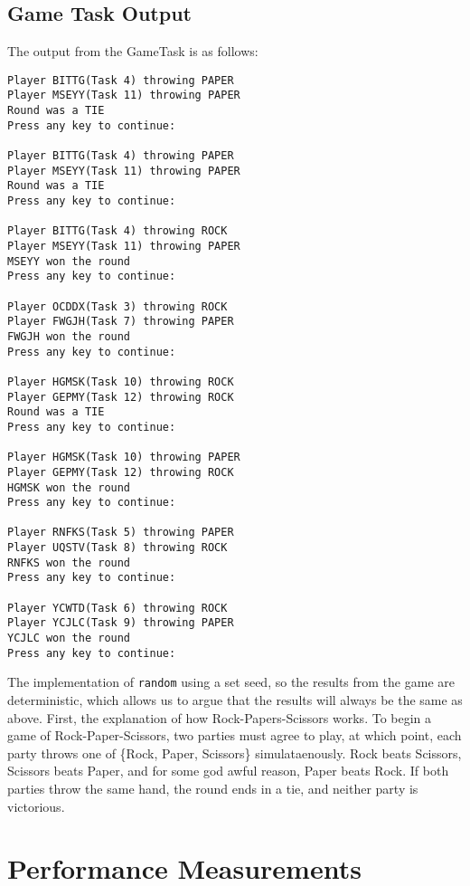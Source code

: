 \documentclass[12pt]{article}
\begin{document}
\subsection{Game Task Output}
The output from the GameTask is as follows:
\begin{verbatim}
Player BITTG(Task 4) throwing PAPER
Player MSEYY(Task 11) throwing PAPER
Round was a TIE
Press any key to continue:

Player BITTG(Task 4) throwing PAPER
Player MSEYY(Task 11) throwing PAPER
Round was a TIE
Press any key to continue:

Player BITTG(Task 4) throwing ROCK
Player MSEYY(Task 11) throwing PAPER
MSEYY won the round
Press any key to continue:

Player OCDDX(Task 3) throwing ROCK
Player FWGJH(Task 7) throwing PAPER
FWGJH won the round
Press any key to continue:

Player HGMSK(Task 10) throwing ROCK
Player GEPMY(Task 12) throwing ROCK
Round was a TIE
Press any key to continue:

Player HGMSK(Task 10) throwing PAPER
Player GEPMY(Task 12) throwing ROCK
HGMSK won the round
Press any key to continue:

Player RNFKS(Task 5) throwing PAPER
Player UQSTV(Task 8) throwing ROCK
RNFKS won the round
Press any key to continue:

Player YCWTD(Task 6) throwing ROCK
Player YCJLC(Task 9) throwing PAPER
YCJLC won the round
Press any key to continue:
\end{verbatim}
The implementation of \texttt{random} using a set seed, so the results from the game are deterministic, which allows us to argue that the results will always be the same as above.  First, the explanation of how Rock-Papers-Scissors works.  To begin a game of Rock-Paper-Scissors, two parties must agree to play, at which point, each party throws one of \{Rock, Paper, Scissors\} simulataenously.  Rock beats Scissors, Scissors beats Paper, and for some god awful reason, Paper beats Rock.  If both parties throw the same hand, the round ends in a tie, and neither party is victorious.
\\[2\baselineskip]

\section{Performance Measurements}
\end{document}
